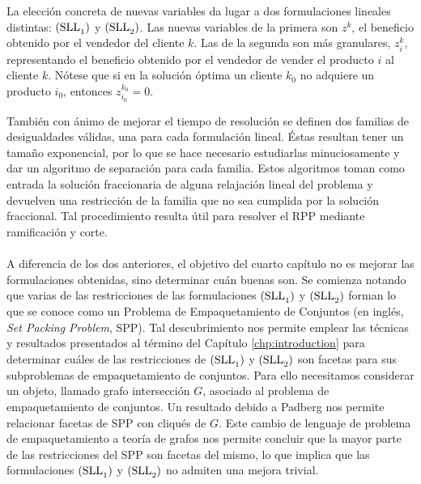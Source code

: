 La elección concreta de nuevas variables da lugar a dos formulaciones lineales
distintas: $\rm{(SLL}_1\rm{)}$ y $\rm{(SLL}_2\rm{)}$. Las nuevas variables de la
primera son $z^k$, el beneficio obtenido por el vendedor del cliente $k$. Las de
la segunda son más granulares, $z^k_i$, representando el beneficio obtenido por
el vendedor de vender el producto $i$ al cliente $k$. Nótese que si en la
solución óptima un cliente $k_0$ no adquiere un producto $i_0$, entonces
$z_{i_0}^{k_0} = 0$.

También con ánimo de mejorar el tiempo de resolución se definen dos familias de
desigualdades válidas, una para cada formulación lineal. Éstas resultan tener un
tamaño exponencial, por lo que se hace necesario estudiarlas minuciosamente y
dar un algoritmo de separación para cada familia. Estos algoritmos toman como
entrada la solución fraccionaria de alguna relajación lineal del problema y
devuelven una restricción de la familia que no sea cumplida por la solución
fraccional. Tal procedimiento resulta útil para resolver el RPP mediante
ramificación y corte.

\paragraph*{}

A diferencia de los dos anteriores, el objetivo del cuarto capítulo no es
mejorar las formulaciones obtenidas, sino determinar cuán buenas son. Se
comienza notando que varias de las restricciones de las formulaciones
$\rm{(SLL}_1\rm{)}$ y $\rm{(SLL}_2\rm{)}$ forman lo que se conoce como un
Problema de Empaquetamiento de Conjuntos (en inglés, \emph{Set Packing Problem},
SPP). Tal descubrimiento nos permite emplear las técnicas y resultados
presentados al término del Capítulo \ref{chp:introduction} para determinar
cuáles de las restricciones de $\rm{(SLL}_1\rm{)}$ y $\rm{(SLL}_2\rm{)}$ son
facetas para sus subproblemas de empaquetamiento de conjuntos. Para ello
necesitamos considerar un objeto, llamado grafo intersección $G$, asociado al
problema de empaquetamiento de conjuntos. Un resultado debido a Padberg
\cite{pa:facial-structure} nos permite relacionar facetas de SPP con cliqués de
$G$. Este cambio de lenguaje de problema de empaquetamiento a teoría de grafos
nos permite concluir que la mayor parte de las restricciones del SPP son facetas
del mismo, lo que implica que las formulaciones $\rm{(SLL}_1\rm{)}$ y $\rm{(SLL}_2\rm{)}$ no
admiten una mejora trivial.

\paragraph*{}

